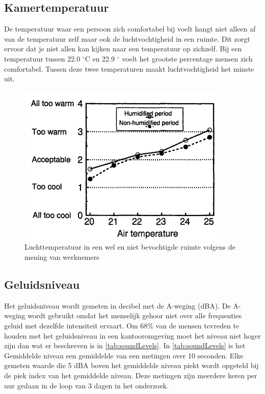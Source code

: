 \subsection{Kamertemperatuur}
De temperatuur waar een persoon zich comfortabel bij voelt hangt niet alleen af van de temperatuur zelf maar ook de luchtvochtigheid in een ruimte\cite{palonen1993effects}. Dit zorgt ervoor dat je niet allen kan kijken naar een temperatuur op zichzelf. Bij een temperatuur tussen 22.0 $^{\circ}$C en 22.9 $^{\circ}$ voelt het grootste percentage mensen zich comfortabel. Tussen deze twee temperaturen maakt luchtvochtigheid het minste uit. 
\begin{figure}[ht]
    \centering
    \includegraphics[scale=0.8]{img/tempHumidGraph.png}
    \caption{Luchttemperatuur in een wel en niet bevochtigde ruimte volgens de mening van werknemers\cite{palonen1993effects}}
\end{figure}


\subsection{Geluidsniveau}
Het geluidsniveau wordt gemeten in decibel met de A-weging (dBA)\cite{aWeighting}. De A-weging wordt gebruikt omdat het menselijk gehoor niet over alle frequenties geluid met dezelfde intensiteit ervaart. Om 68\% van de mensen tevreden te houden met het geluidsniveau in een kantooromgeving moet het niveau niet hoger zijn dan wat er beschreven is in \autoref{tab:soundLevels}\cite{geluid-levels}. In \autoref{tab:soundLevels} is het Gemiddelde niveau een gemiddelde van een metingen over 10 seconden. Elke gemeten waarde die 5 dBA boven het gemiddelde niveau piekt wordt opgeteld bij de piek index van het gemiddelde niveau. Deze metingen zijn meerdere keren per uur gedaan in de loop van 3 dagen in het onderzoek\cite{geluid-levels}. 

